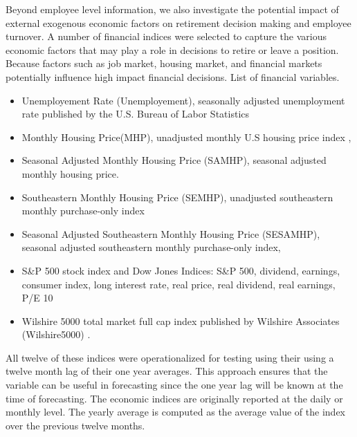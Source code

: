 \documentclass[12pt,letterpaper]{article}
\begin{document}
Beyond employee level information, we also investigate the potential impact of external exogenous economic factors on retirement decision making and employee turnover.  A number of financial indices were selected to capture the various economic factors that may play a role in decisions to retire or leave a position.  Because factors such as job market, housing market, and financial markets potentially influence high impact financial decisions.
List of financial variables.
\begin{itemize}
	\item Unemployement Rate (Unemployement),  seasonally adjusted unemployment rate published by the U.S. Bureau of Labor Statistics \citep{unemployment}
	\item Monthly Housing Price(MHP), unadjusted monthly U.S housing price index \citep{HPI},
	\item Seasonal Adjusted Monthly Housing Price (SAMHP), seasonal adjusted monthly housing price.
	\item Southeastern Monthly Housing Price (SEMHP), unadjusted southeastern monthly purchase-only index
	\item Seasonal Adjusted Southeastern Monthly Housing Price (SESAMHP), seasonal adjusted southeastern monthly purchase-only index,
	\item S\&P 500 stock index and Dow Jones Indices: S\&P 500, dividend, earnings, consumer index, long interest rate, real price, real dividend, real earnings, P/E 10 \citep{sp500}  
   \item Wilshire 5000 total market full cap index published by Wilshire Associates (Wilshire5000) \citep{will5000}.
\end{itemize}
All twelve of these indices were operationalized for testing using their using a twelve month lag of their one year averages.  This approach ensures that the variable can be useful in forecasting since the one year lag will be known at the time of forecasting.  The economic indices are originally reported at the daily or monthly level. The yearly average is computed as the average value of the index over the previous twelve months.

\end{document}
